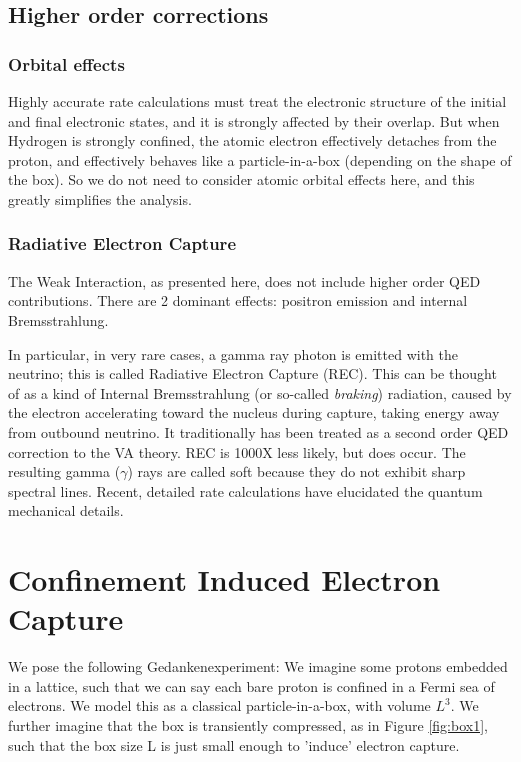 \documentclass[%
 aip,
 jmp,%
 amsmath,amssymb,
 reprint,%
]{revtex4-1}
\begin{document}
\subsection{Higher order corrections}

\subsubsection{Orbital effects}
Highly accurate rate calculations must treat the electronic structure of the initial and final electronic states, and it is strongly affected by their overlap.  But when Hydrogen is strongly confined, the atomic electron effectively detaches from the proton, and effectively behaves like a particle-in-a-box (depending on the shape of the box).\cite{Sen}  So we do not need to consider atomic orbital effects here, and this greatly simplifies the analysis. 

\subsubsection{Radiative Electron Capture}

The Weak Interaction, as presented here, does not include higher order QED contributions.  There are 2 dominant effects: positron emission and internal Bremsstrahlung.\cite{Jauch}

In particular, in very rare cases, a gamma ray photon is emitted with the neutrino; this is called Radiative Electron Capture (REC).\cite{glauber1,glauber2, Jauch, roec2007} This can be thought of as a kind of Internal Bremsstrahlung (or so-called \emph{braking}) radiation, caused by the electron accelerating toward the nucleus during capture, taking energy away from outbound neutrino.\cite{jackson} It traditionally has been treated as a second order QED correction to the VA theory.\cite{Jauch}  REC is 1000X less likely, but does occur.   The resulting gamma ($\gamma$) rays are called soft because they do not exhibit sharp spectral lines.    Recent, detailed rate calculations have elucidated the quantum mechanical details.\cite{roec2007}


\section{Confinement Induced Electron Capture}

We pose the following Gedankenexperiment:   We imagine some protons embedded in a lattice, such that we can say each bare proton is confined in a Fermi sea of electrons. We model this as a classical particle-in-a-box, with volume $L^3$.   We further imagine that the box is transiently compressed, as in Figure \ref{fig:box1}, such that the box size L is just small enough to  'induce' electron capture.  
\end{document}
